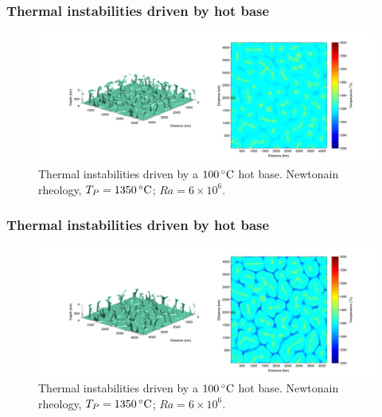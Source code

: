 \documentclass[aspectratio=169]{beamer}
\begin{document}
\begin{frame}
    \frametitle{Thermal instabilities driven by hot base}
    \begin{figure}
        \vspace{-.5cm}
        \includegraphics[width=0.85\paperwidth]{./figures/Newt100/dT1.0741_4x4_Newt_Ra6e6_5.png}
        \caption{Thermal instabilities driven by a $100\rm\,^{\circ}C$ hot base. Newtonain rheology, $T_{P}=1350\rm\,^{\circ}C$; $Ra = 6\times10^{6}$.}
    \end{figure}
\end{frame}

\begin{frame}
    \frametitle{Thermal instabilities driven by hot base}
    \begin{figure}
        \vspace{-.5cm}
        \includegraphics[width=0.85\paperwidth]{./figures/Newt100/dT1.0741_4x4_Newt_Ra6e6_6.png}
        \caption{Thermal instabilities driven by a $100\rm\,^{\circ}C$ hot base. Newtonain rheology, $T_{P}=1350\rm\,^{\circ}C$; $Ra = 6\times10^{6}$.}
    \end{figure}
\end{frame}
\end{document}
